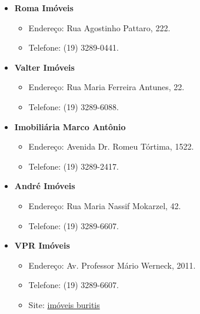\begin{itemize}
\item  \textbf{Roma Imóveis}
\begin{itemize}
\item  Endereço: Rua Agostinho Pattaro, 222.
\item  Telefone: (19) 3289-0441.
\end{itemize}
\end{itemize}

\begin{itemize}
\item  \textbf{Valter Imóveis}
\begin{itemize}
\item  Endereço: Rua Maria Ferreira Antunes, 22.
\item  Telefone: (19) 3289-6088.
\end{itemize}
\end{itemize}

\begin{itemize}
\item  \textbf{Imobiliária Marco Antônio}
\begin{itemize}
\item  Endereço: Avenida Dr. Romeu Tórtima, 1522.
\item  Telefone: (19) 3289-2417.
\end{itemize}
\end{itemize}

\begin{itemize}
\item  \textbf{André Imóveis}
\begin{itemize}
\item  Endereço: Rua Maria Nassif Mokarzel, 42.
\item  Telefone: (19) 3289-6607.
\end{itemize}
\end{itemize}

\begin{itemize}
\item  \textbf{VPR Imóveis}
\begin{itemize}
\item  Endereço: Av. Professor Mário Werneck, 2011.
\item  Telefone: (19) 3289-6607.
\item  Site: \href{http://www.vprimoveis.com.br/}{imóveis buritis}
\end{itemize}
\end{itemize}
